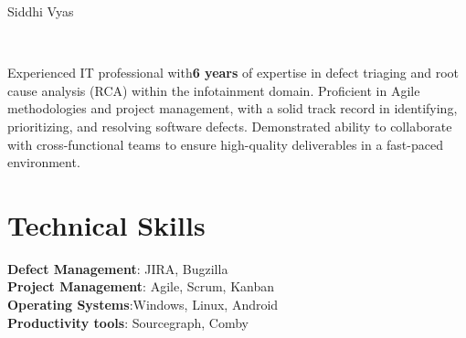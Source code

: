 \documentclass[letterpaper,10pt]{article}
\newcommand{\MYhref}[3][blue]{\href{#2}{\color{#1}{#3}}}%
\begin{document}
\begin{center}
    {\LARGE Siddhi Vyas} \\ \vspace{2pt}
    \begin{multicols}{2}
    \begin{flushleft}
    \MYhref{https://www.linkedin.com/in/siddhi-vyas-csm}{LinkedIn \faLinkedinSquare}

    \end{flushleft}
    
    \begin{flushright}
    \MYhref{mailto:siddhi3011vyas@gmail.com}{siddhi3011vyas@gmail.com}\\
    \MYhref{tel:+919727787438}{+91 9727787438}
    \end{flushright}
    \end{multicols}
\end{center}


    \small{Experienced IT professional with\textbf{6 years} of expertise in defect triaging and root cause analysis (RCA) within the infotainment domain. Proficient in Agile methodologies and project management, with a solid track record in identifying, prioritizing, and resolving software defects. Demonstrated ability to collaborate with cross-functional teams to ensure high-quality deliverables in a fast-paced environment.}

\section{Technical Skills}
 \begin{itemize}[leftmargin=0.15in, label={}]
    \vspace{10pt}
    \small{\item{
        \textbf{Defect Management}{: JIRA, Bugzilla} \\
        \vspace{2pt}
        \textbf{Project Management}{: Agile, Scrum, Kanban} \\
        \vspace{2pt}
        \textbf{Operating Systems}{:Windows, Linux, Android}\\
        \vspace{2pt}
        \textbf{Productivity tools}{: Sourcegraph, Comby}\\
    }}
 \end{itemize}
\end{document}
